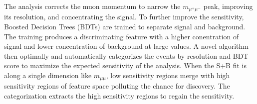 The analysis corrects the muon momentum to narrow the $m_{\mu^+\mu^-}$ peak, improving its resolution, and concentrating the signal. To further improve the sensitivity, Boosted Decision Trees (BDTs) \cite{bdt} are trained to separate signal and background. The training produces a discriminating feature with a higher conentration of signal and lower concentration of background at large values. A novel algorithm then optimally and automatically categorizes the events by resolution and BDT score to maximize the expected sensitivity of the analysis. When the S+B fit is along a single dimension like $m_{\mu\mu}$, low sensitivity regions merge with high sensitivity regions of feature space polluting the chance for discovery. The categorization extracts the high sensitivity regions to regain the sensitivity. 

